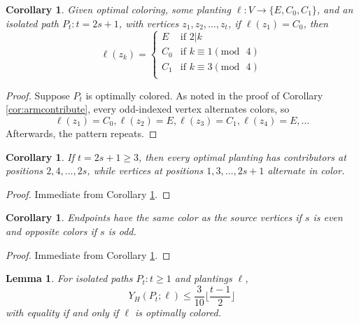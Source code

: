 \documentclass[11pt]{article}
\theoremstyle{plain}
\newtheorem{lemma}[theorem]{Lemma}
\newtheorem{corollary}[theorem]{Corollary}
\begin{document}
\begin{corollary} \label{cor:altcolorpattern}
    Given optimal coloring, some planting $\ell:V \to \{E, C_0, C_1\}$, and an isolated path $P_t:t=2s+1$, with vertices $z_1, z_2, \dots, z_t$, if $\ell (z_1) = C_0$, then
    \[
    \ell(z_k) = \begin{cases}
        E & \text{if } 2|k\\
        C_0 & \text{if } k \equiv 1 (\mathrm{mod} \text{ } 4) \\
        C_1 & \text{if } k \equiv 3 (\mathrm{mod} \text{ } 4) \\
    \end{cases}
    \]
\end{corollary}

\begin{proof}
    Suppose $P_t$ is optimally colored. As noted in the proof of Corollary \ref{cor:armcontribute}, every odd-indexed vertex alternates colors, so 
    \[\ell(z_1) = C_0, \ell(z_2) = E, \ell(z_3) = C_1, \ell(z_4) = E,\dots\]
    Afterwards, the pattern repeats.
\end{proof}

\begin{corollary} \label{cor:optplantingevenemptoddcolor}
     If $t=2s+1 \geq 3$, then every optimal planting has contributors at positions $2, 4, \dots, 2s$, while vertices at positions $1, 3, \dots, 2s+1$ alternate in color.
\end{corollary}

\begin{proof}
    Immediate from Corollary \ref{cor:altcolorpattern}.
\end{proof}

\begin{corollary} \label{cor:endpointcolor}
    Endpoints have the same color as the source vertices if $s$ is even and opposite colors if $s$ is odd. 
\end{corollary}

\begin{proof}
    Immediate from Corollary \ref{cor:optplantingevenemptoddcolor}.
\end{proof}

\begin{lemma} \label{lem:optimalplanting}
    For isolated paths $P_t:t \geq 1$ and plantings $\ell$, 
    \[Y_H(P_t;\ell) \leq \frac{3}{10} \lfloor \frac{t-1}{2} \rfloor\]
    with equality if and only if $\ell$ is optimally colored. 
\end{lemma}
\end{document}
